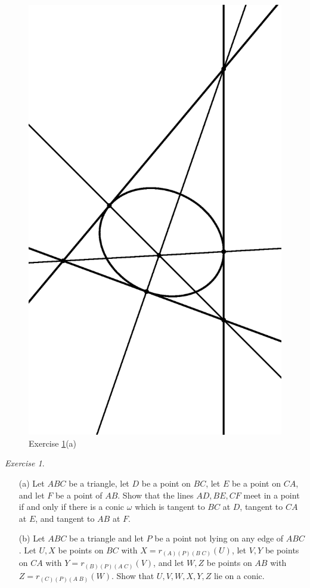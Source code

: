 \documentclass[letterpaper,11pt]{article}
\theoremstyle{definition}
\theoremstyle{remark}
\newtheorem{exer}{Exercise}
\begin{document}
\begin{figure}[!htb]
\centering
\includegraphics[scale=0.3,angle=270]{cevaconic.eps}
\caption{Exercise \ref{cevaconic}(a)}
\end{figure}

\begin{exer}\label{cevaconic}
\begin{itemize}
\item[(a)] Let $ABC$ be a triangle, let $D$ be a point on $BC$, let $E$ be a point on $CA$, and let $F$ be a point of $AB$. Show that the lines $AD,BE,CF$ meet in a point if and only if there is a conic $\omega$ which is tangent to $BC$ at $D$, tangent to $CA$ at $E$, and tangent to $AB$ at $F$.
\item[(b)] Let $ABC$ be a triangle and let $P$ be a point not lying on any edge of $ABC$. Let $U,X$ be points on $BC$ with $X = r_{(A)(P)(B\;C)}(U)$, let $V,Y$ be points on $CA$ with $Y = r_{(B)(P)(A\;C)}(V)$, and let $W,Z$ be points on $AB$ with $Z = r_{(C)(P)(A\;B)}(W)$. Show that $U,V,W,X,Y,Z$ lie on a conic.
\end{itemize}
\end{exer}
\end{document}
